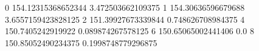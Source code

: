 0 154.12315368652344 3.472503662109375
1 154.30636596679688 3.6557159423828125
2 151.39927673339844 0.748626708984375
4 150.7405242919922 0.089874267578125
6 150.65065002441406 0.0
8 150.85052490234375 0.1998748779296875
